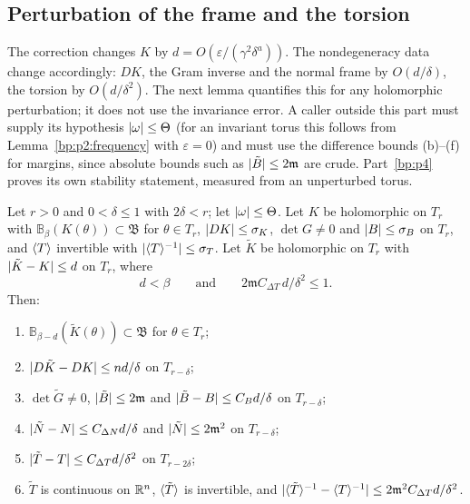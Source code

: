 \subsection{Perturbation of the frame and the torsion}\label{bp:p2:sec-perturbation}

The correction changes $K$ by $d=O(\varepsilon/(\gamma^2\delta^a))$. The nondegeneracy data change
accordingly: $DK$, the Gram inverse and the normal frame by $O(d/\delta)$, the torsion by
$O(d/\delta^2)$. The next lemma quantifies this for any holomorphic perturbation; it does not use the
invariance error. A caller outside this part must supply its hypothesis $\lvert \omega\rvert\le\Theta$ (for an
invariant torus this follows from Lemma~\ref{bp:p2:frequency} with $\varepsilon=0$) and must use the
difference bounds (b)--(f) for margins, since absolute bounds such as $\lvert \tilde B\rvert\le2\mathfrak m$ are
crude. Part~\ref{bp:p4} proves its own stability statement, measured from an unperturbed torus.

\begin{lemma}\label{bp:p2:perturbation}
Let $r>0$ and $0<\delta\le1$ with $2\delta<r$; let $\lvert \omega\rvert\le\Theta$. Let $K$ be holomorphic on
$T_r$ with $\mathbb B_\beta(K(\theta))\subset\mathfrak B$ for $\theta\in T_r$, $\lvert DK\rvert\le\sigma_K$,
$\det G\ne0$ and $\lvert B\rvert\le\sigma_B$ on $T_r$, and $\langle T\rangle$ invertible with $\lvert \langle T\rangle^{-1}\rvert\le
\sigma_T$. Let $\tilde K$ be holomorphic on $T_r$ with $\lvert \tilde K-K\rvert\le d$ on $T_r$, where
\[
d<\beta\qquad\text{and}\qquad2\mathfrak mC_{\Delta T}\,d/\delta^2\le1.
\]
Then:
\begin{enumerate}[label=(\alph*)]
\item $\mathbb B_{\beta-d}(\tilde K(\theta))\subset\mathfrak B$ for $\theta\in T_r$;
\item $\lvert D\tilde K-DK\rvert\le nd/\delta$ on $T_{r-\delta}$;
\item $\det\tilde G\ne0$, $\lvert \tilde B\rvert\le2\mathfrak m$ and $\lvert \tilde B-B\rvert\le C_Bd/\delta$ on
  $T_{r-\delta}$;
\item $\lvert \tilde N-N\rvert\le C_{\Delta N}d/\delta$ and $\lvert \tilde N\rvert\le2\mathfrak m^2$ on $T_{r-\delta}$;
\item $\lvert \tilde T-T\rvert\le C_{\Delta T}d/\delta^2$ on $T_{r-2\delta}$;
\item $\tilde T$ is continuous on $\mathbb{R}^n$, $\langle \tilde T\rangle$ is invertible, and $\lvert \langle \tilde T\rangle^{-1}
  -\langle T\rangle^{-1}\rvert\le2\mathfrak m^2C_{\Delta T}d/\delta^2$.
\end{enumerate}
\end{lemma}

